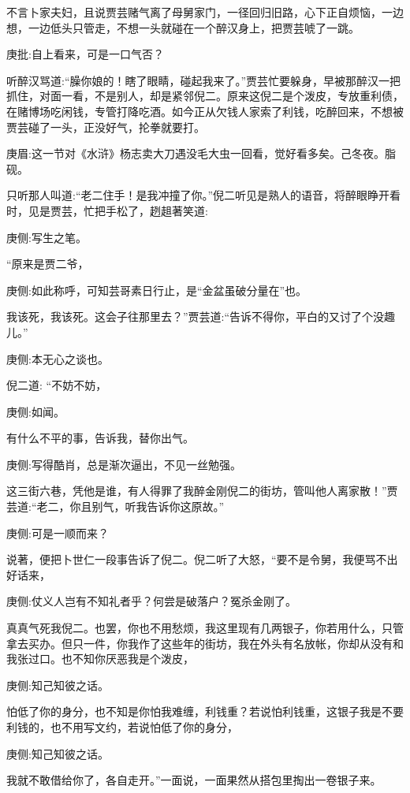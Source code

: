 \begin{parag}
    不言卜家夫妇，且说贾芸赌气离了母舅家门，一径回归旧路，心下正自烦恼，一边想，一边低头只管走，不想一头就碰在一个醉汉身上，把贾芸唬了一跳。\begin{note}庚批:自上看来，可是一口气否？\end{note}听醉汉骂道:“臊你娘的！瞎了眼睛，碰起我来了。”贾芸忙要躲身，早被那醉汉一把抓住，对面一看，不是别人，却是紧邻倪二。原来这倪二是个泼皮，专放重利债，在赌博场吃闲钱，专管打降吃酒。如今正从欠钱人家索了利钱，吃醉回来，不想被贾芸碰了一头，正没好气，抡拳就要打。\begin{note}庚眉:这一节对《水浒》杨志卖大刀遇没毛大虫一回看，觉好看多矣。己冬夜。脂砚。\end{note}只听那人叫道:“老二住手！是我冲撞了你。”倪二听见是熟人的语音，将醉眼睁开看时，见是贾芸，忙把手松了，趔趄著笑道:\begin{note}庚侧:写生之笔。\end{note}“原来是贾二爷，\begin{note}庚侧:如此称呼，可知芸哥素日行止，是“金盆虽破分量在”也。\end{note}我该死，我该死。这会子往那里去？”贾芸道:“告诉不得你，平白的又讨了个没趣儿。”\begin{note}庚侧:本无心之谈也。\end{note}倪二道: “不妨不妨，\begin{note}庚侧:如闻。\end{note}有什么不平的事，告诉我，替你出气。\begin{note}庚侧:写得酷肖，总是渐次逼出，不见一丝勉强。\end{note}这三街六巷，凭他是谁，有人得罪了我醉金刚倪二的街坊，管叫他人离家散！”贾芸道:“老二，你且别气，听我告诉你这原故。”\begin{note}庚侧:可是一顺而来？\end{note}说著，便把卜世仁一段事告诉了倪二。倪二听了大怒，“要不是令舅，我便骂不出好话来，\begin{note}庚侧:仗义人岂有不知礼者乎？何尝是破落户？冤杀金刚了。\end{note}真真气死我倪二。也罢，你也不用愁烦，我这里现有几两银子，你若用什么，只管拿去买办。但只一件，你我作了这些年的街坊，我在外头有名放帐，你却从没有和我张过口。也不知你厌恶我是个泼皮，\begin{note}庚侧:知己知彼之话。\end{note}怕低了你的身分，也不知是你怕我难缠，利钱重？若说怕利钱重，这银子我是不要利钱的，也不用写文约，若说怕低了你的身分，\begin{note}庚侧:知己知彼之话。\end{note}我就不敢借给你了，各自走开。”一面说，一面果然从搭包里掏出一卷银子来。
\end{parag}


